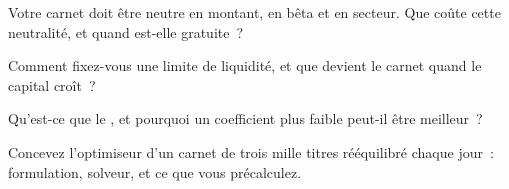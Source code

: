 \begin{interviewq}\label{iq:rs:portfolio-construction-i:3}
Votre carnet doit être neutre en montant, en bêta et en secteur. Que coûte cette neutralité, et quand est-elle gratuite~?
\end{interviewq}

\begin{interviewq}\label{iq:rs:portfolio-construction-i:4}
Comment fixez-vous une limite de liquidité, et que devient le carnet quand le capital croît~?
\end{interviewq}

\begin{interviewq}\label{iq:rs:portfolio-construction-i:5}
Qu'est-ce que le , et pourquoi un coefficient plus faible peut-il être meilleur~?
\end{interviewq}

\begin{interviewq}\label{iq:rs:portfolio-construction-i:6}
Concevez l'optimiseur d'un carnet de trois mille titres rééquilibré chaque jour~: formulation, solveur, et ce que vous précalculez.
\end{interviewq}
